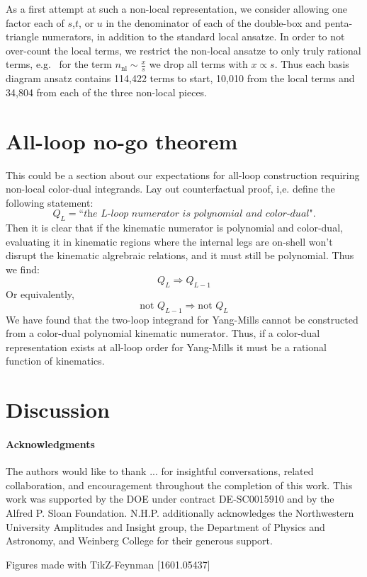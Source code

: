 \documentclass[11pt,letter]{article}
\newcommand{\eg}{e.g.~}
\def\be{\begin{equation}}
\def\ee{\end{equation}}
\begin{document}
As a first attempt at such a non-local representation, we consider
allowing one factor each of $s$,$t$, or $u$ in the denominator of each
of the double-box and penta-triangle numerators, in addition to the
standard local ansatze.  In order to not over-count the local terms,
we restrict the non-local ansatze to only truly rational terms, \eg
for the term $n_{\text{nl}}\sim \frac{x}{s}$ we drop all terms with
$x \propto s$.  Thus each basis diagram ansatz contains 114,422 terms
to start, 10,010 from the local terms and 34,804 from each of the
three non-local pieces.
\fi


\section{All-loop no-go theorem}
This could be a section about our expectations for all-loop construction requiring non-local color-dual integrands. Lay out counterfactual proof, i,e. define the following statement:
\be
 Q_L=\textit{``the $L$-loop numerator is polynomial and color-dual"}. 
\ee
Then it is clear that if the kinematic numerator is polynomial and color-dual, evaluating it in kinematic regions where the internal legs are on-shell won't disrupt the kinematic algrebraic relations, and it must still be polynomial. Thus we find:
\be
Q_L \Rightarrow Q_{L-1}
\ee
Or equivalently,
\be
\text{not }Q_{L-1}\Rightarrow \text{not }Q_L
\ee
We have found that the two-loop integrand for Yang-Mills cannot be constructed from a color-dual polynomial kinematic numerator. Thus, if a color-dual representation exists at all-loop order for Yang-Mills it must be a rational function of kinematics. 
  
\section{Discussion}\label{sec:Discussion}
\paragraph{Acknowledgments} The authors would like to thank ... for insightful conversations, related collaboration, and encouragement throughout the completion of this work. This work was supported by the DOE under contract DE-SC0015910 and by the Alfred P. Sloan Foundation. N.H.P. additionally acknowledges the Northwestern University Amplitudes and Insight group, the Department of Physics and Astronomy, and Weinberg College for their generous support. 

Figures made with TikZ-Feynman [1601.05437]
\end{document}
